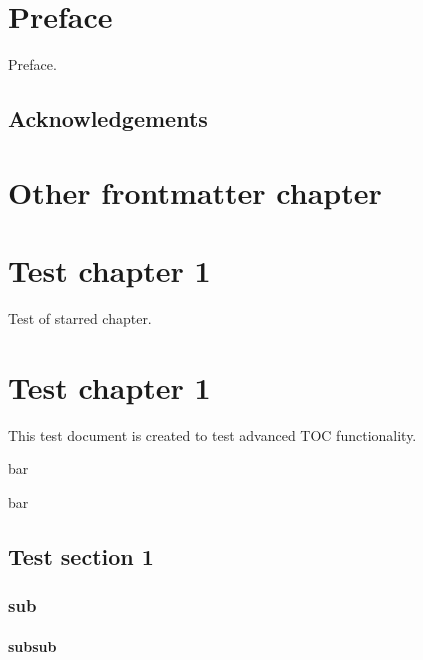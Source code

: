 \documentclass{book}
\begin{document}
%

\frontmatter

\chapter{Preface}
Preface.

\section{Acknowledgements}

\chapter[Other]{Other frontmatter chapter}

\tableofcontents

\mainmatter

\chapter*{Test chapter 1}
Test of starred chapter.

\chapter{Test chapter 1}
This test document is created to test advanced TOC functionality.

\begin{table}
  \caption[foo]{bar}
\end{table}
\begin{table}
  \caption[foo] {bar}
\end{table}

\section{Test section 1}

\subsection{sub}

\subsubsection{subsub}
\end{document}
